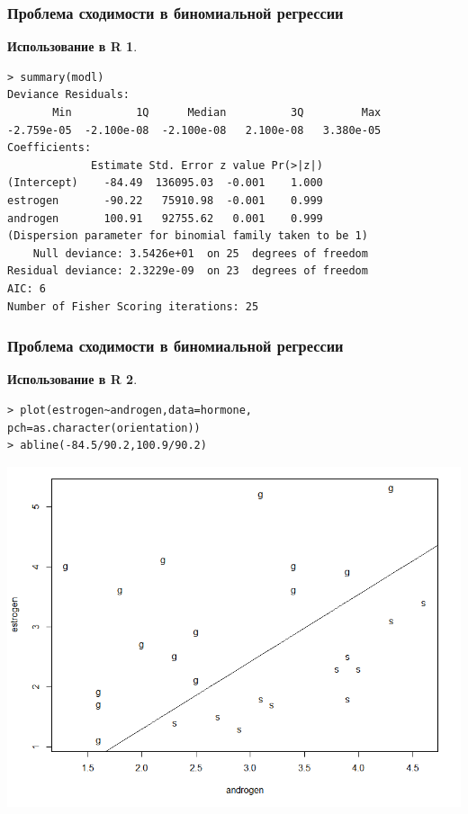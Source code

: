 \documentclass{beamer}
\newtheorem{exmpr}{Использование в R}
\begin{document}
\begin{frame}[containsverbatim]
\frametitle{Проблема сходимости в биномиальной регрессии}
\begin{exmpr}
\begin{verbatim}
> summary(modl)
Deviance Residuals: 
       Min          1Q      Median          3Q         Max  
-2.759e-05  -2.100e-08  -2.100e-08   2.100e-08   3.380e-05  
Coefficients:
             Estimate Std. Error z value Pr(>|z|)
(Intercept)    -84.49  136095.03  -0.001    1.000
estrogen       -90.22   75910.98  -0.001    0.999
androgen       100.91   92755.62   0.001    0.999
(Dispersion parameter for binomial family taken to be 1)
    Null deviance: 3.5426e+01  on 25  degrees of freedom
Residual deviance: 2.3229e-09  on 23  degrees of freedom
AIC: 6
Number of Fisher Scoring iterations: 25
\end{verbatim}
\end{exmpr}

\end{frame}

\begin{frame}[containsverbatim]
\frametitle{Проблема сходимости в биномиальной регрессии}
\begin{exmpr}
\begin{verbatim}
> plot(estrogen~androgen,data=hormone,
pch=as.character(orientation))
> abline(-84.5/90.2,100.9/90.2)
\end{verbatim}
\end{exmpr}
\includegraphics[width=1\textwidth,height=0.6\textheight]{logitplot2.png}
\end{frame}
\end{document}
